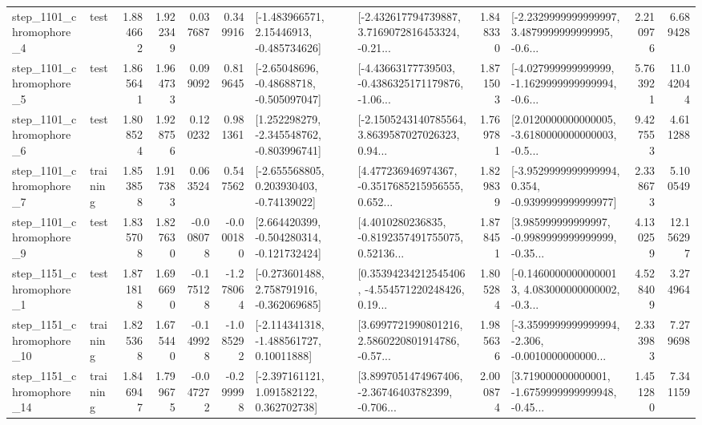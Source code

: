 \begin{tabular}{llrrrrllrlrr}
  step\_1101\_chromophore\_4 &      test &      1.884662 &    1.922349 &      0.037687 &  0.349916 &    [-1.483966571, 2.15446913, -0.485734626] &  [-2.432617794739887, 3.7169072816453324, -0.21... &       1.848330 &  [-2.2329999999999997, 3.4879999999999995, -0.6... &            2.210976 &          6.689428 \\
  step\_1101\_chromophore\_5 &      test &      1.865641 &    1.964733 &      0.099092 &  0.819645 &    [-2.65048696, -0.48688718, -0.505097047] &  [-4.43663177739503, -0.4386325171179876, -1.06... &       1.871503 &  [-4.027999999999999, -1.1629999999999994, -0.6... &            5.763921 &         11.042044 \\
  step\_1101\_chromophore\_6 &      test &      1.808524 &    1.928756 &      0.120232 &  0.981361 &   [1.252298279, -2.345548762, -0.803996741] &  [-2.1505243140785564, 3.8639587027026323, 0.94... &       1.769781 &  [2.0120000000000005, -3.6180000000000003, -0.5... &            9.427553 &          4.611288 \\
  step\_1101\_chromophore\_7 &  training &      1.853858 &    1.917383 &      0.063524 &  0.547562 &    [-2.655568805, 0.203930403, -0.74139022] &  [4.477236946974367, -0.3517685215956555, 0.652... &       1.829839 &  [-3.9529999999999994, 0.354, -0.9399999999999977] &            2.338673 &          5.100549 \\
  step\_1101\_chromophore\_9 &      test &      1.835708 &    1.827630 &     -0.008078 & -0.000180 &   [2.664420399, -0.504280314, -0.121732424] &  [4.4010280236835, -0.8192357491755075, 0.52136... &       1.878451 &  [3.985999999999997, -0.9989999999999999, -0.35... &            4.130259 &         12.156297 \\
  step\_1151\_chromophore\_1 &      test &      1.871818 &    1.696690 &     -0.175128 & -1.278064 &   [-0.273601488, 2.758791916, -0.362069685] &  [0.35394234212545406, -4.554571220248426, 0.19... &       1.805284 &  [-0.14600000000000013, 4.083000000000002, -0.3... &            4.528409 &          3.274964 \\
 step\_1151\_chromophore\_10 &  training &      1.825368 &    1.675440 &     -0.149928 & -1.085292 &    [-2.114341318, -1.488561727, 0.10011888] &  [3.6997721990801216, 2.5860220801914786, -0.57... &       1.985636 &  [-3.3599999999999994, -2.306, -0.0010000000000... &            2.333983 &          7.279698 \\
 step\_1151\_chromophore\_14 &  training &      1.846947 &    1.799675 &     -0.047272 & -0.299998 &    [-2.397161121, 1.091582122, 0.362702738] &  [3.8997051474967406, -2.36746403782399, -0.706... &       2.000874 &  [3.719000000000001, -1.6759999999999948, -0.45... &            1.451280 &          7.341159 \\

\end{tabular}
